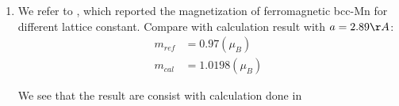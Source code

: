 \documentclass[notitlepage]{revtex4-1}
\begin{document}
\begin{CJK}{UTF8}{bsmi}
\begin{enumerate}
\begin{enumerate}[label=(\alph*)]
		\item We refer to \cite{PhysRevB.38.423}, which reported the magnetization of ferromagnetic bcc-Mn for different lattice constant. Compare with calculation result with $a = 2.89 \AA$:
		\begin{align*}
			m_{ref} &= 0.97   (\mu_B)\\
			m_{cal} &= 1.0198 (\mu_B)
 		\end{align*}
		
		We see that the result are consist with calculation done in\cite{PhysRevB.38.423} 
		
		
		
	
	\end{enumerate}

\end{enumerate}


\end{CJK}



	
\end{document}
